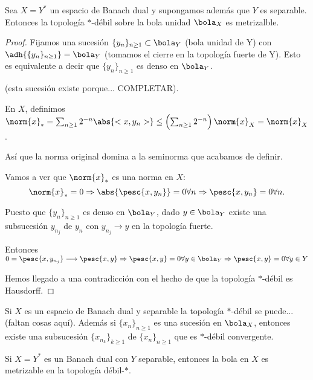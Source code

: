 \documentclass[palatino]{apuntes}
\begin{document}
\begin{theorem} Sea $X = Y^*$ un espacio de Banach dual y supongamos además que $Y$ es separable. Entonces la topología $*$-débil sobre la bola unidad $\bola_X$ es metrizalble.
\end{theorem}

\begin{proof}

Fijamos una sucesión $\{ y_n \}_{n \geq 1} \subset \bola_Y $ (bola unidad de Y) con $ \adh{\{ y_n \}_{n \geq 1}} = \bola_Y $ (tomamos el cierre en la topología fuerte de Y). Esto es equivalente a decir que $\{ y_n \}_{n \geq 1}$ es denso en $\bola_Y$.

(esta sucesión existe porque... COMPLETAR).

En $X$, definimos $ \norm{x}_* = \sum_{n \geq 1} 2^{-n} \abs{<x, y_n>} \leq \left( \sum_{n \geq 1} 2^{-n} \right) \norm{x}_X = \norm{x}_X $.

Así que la norma original domina a la seminorma que acabamos de definir.

Vamos a ver que $\norm{x}_*$ es una norma en $X$: \[ \norm{x}_* = 0 \Rightarrow \abs{\pesc{x, y_n}} = 0 \forall n \Rightarrow \pesc{x, y_n} = 0 \forall n.\]

Puesto que $\{ y_n \}_{n \geq 1}$ es denso en $\bola_Y$, dado $y \in \bola_Y$ existe una subsucesión $y_{n_j}$ de $y_n$ con $y_{n_j} \longrightarrow y$ en la topología fuerte.

Entonces $ 0 = \pesc{x, y_{n_j}} \longrightarrow \pesc{x, y} \Rightarrow \pesc{x, y} = 0 \forall y \in \bola_Y \Rightarrow \pesc{x, y} = 0 \forall y \in Y $

Hemos llegado a una contradicción con el hecho de que la topología $*$-débil es Hausdorff.

\end{proof}

\begin{corol} Si $X$ es un espacio de Banach dual y separable la topología $*$-débil se puede... (faltan cosas aquí). Además si $\{x_n\}_{n \geq 1}$ es una sucesión en $\bola_X$, entonces existe una subsucesión $\{x_{n_k}\}_{k \geq 1}$ de $\{x_n\}_{n \geq 1}$ que es $*$-débil convergente.
\end{corol}

\begin{theorem} Si $X = Y^*$ es un Banach dual con $Y$ separable, entonces la bola en $X$ es metrizable en la topología débil-$*$.
\end{theorem}
\end{document}
